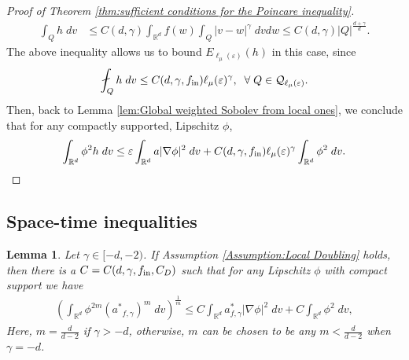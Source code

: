 \documentclass[12pt,american]{amsart}
\numberwithin{equation}{section}
\theoremstyle{plain}
\newtheorem{lem}[thm]{Lemma}
\theoremstyle{definition}                  %
\def\astar{{a^*}}
\def\fin{f_{\textnormal{in}}}
\begin{document}
\begin{proof}[Proof of Theorem  \ref{thm:sufficient conditions for the Poincare inequality}]
\begin{align*}
    \int_{Q}h\;dv & \leq C(d,\gamma)\int_{\mathbb{R}^d}  f(w) \int_{Q}|v-w|^{\gamma} \; dvdw \leq  C(d,\gamma)|Q |^{\frac{d+\gamma}{d}}.
  \end{align*} 
  The above inequality allows us to bound $E_{\ell_\mu(\varepsilon)}(h)$ in this case, since
  \begin{align*}
    \fint_{Q} h\;dv\leq C(d,\gamma,\fin)\ell_\mu(\varepsilon)^\gamma,\;\;\forall\;Q\in\mathcal{Q}_{\ell_\mu(\varepsilon)}.
  \end{align*}  
  Then, back to Lemma \ref{lem:Global weighted Sobolev from local ones}, we conclude that for any compactly supported, Lipschitz $\phi$,
  \begin{align*}	
    \int_{\mathbb{R}^d} \phi^2 h\;dv \leq  \varepsilon\int_{\mathbb{R}^d}a|\nabla \phi|^2\;dv + C(d,\gamma,\fin)\ell_\mu(\varepsilon)^\gamma\int_{\mathbb{R}^d} \phi^2\;dv.	
  \end{align*}	
      
\end{proof}

  \subsection{Space-time inequalities}\label{Space time inequalities}

  \begin{lem}\label{lem:Sobolev weight astar astar to the m}
    Let $\gamma \in [-d,-2)$. If Assumption \ref{Assumption:Local Doubling} holds, then there is a $C=C(d,\gamma,\fin,C_D)$  such that for any Lipschitz $\phi$ with compact support we have
    \begin{align*}
      \left ( \int_{\mathbb{R}^d}  \phi^{2m}(\astar_{f,\gamma})^m \;dv\right )^{\frac{1}{m}}\leq C\int_{\mathbb{R}^d} a_{f,\gamma}^*|\nabla \phi|^2\;dv+C\int_{\mathbb{R}^d}\phi^2\;dv,		
    \end{align*}	        
    Here, $m = \frac{d}{d-2}$ if $\gamma>-d$, otherwise, $m$ can be chosen to be any $m<\frac{d}{d-2}$ when $\gamma=-d$.
  \end{lem}
  
\end{document}
